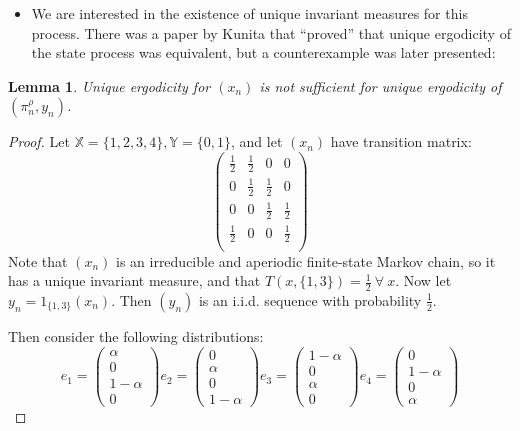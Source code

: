 \documentclass{article}
\newtheorem{lemma}[theorem]{Lemma}
\begin{document}
\begin{itemize}
    \item We are interested in the existence of unique invariant measures for this process. There was a paper by Kunita that ``proved'' that unique ergodicity of the state process was equivalent, but a counterexample was later presented:
\end{itemize}

\begin{lemma}
    Unique ergodicity for \((x_n)\) is not sufficient for unique ergodicity of \((\pi^\rho_n,y_n)\).
\end{lemma}

\begin{proof}
    Let \(\mathbb{X} = \{1,2,3,4\}, \mathbb{Y} = \{0,1\}\), and let \((x_n)\) have transition matrix:
    \[
        \begin{pmatrix}
            \frac{1}{2} & \frac{1}{2} & 0           & 0           \\
            0           & \frac{1}{2} & \frac{1}{2} & 0           \\
            0           & 0           & \frac{1}{2} & \frac{1}{2} \\
            \frac{1}{2} & 0           & 0           & \frac{1}{2} \\
        \end{pmatrix}\]
    Note that \((x_n)\) is an irreducible and aperiodic finite-state Markov chain, so it has a unique invariant measure, and that \(T(x,\{1,3\}) = \frac{1}{2} \: \forall \: x\). Now let \(y_n = 1_{\{1,3\}}(x_n)\). Then \((y_n)\) is an i.i.d. sequence with probability \(\frac{1}{2}\).

    Then consider the following distributions:
    \[e_1 = \begin{pmatrix}
            \alpha \\ 0 \\ 1 - \alpha \\ 0
        \end{pmatrix}
        e_2 = \begin{pmatrix}
            0 \\ \alpha \\ 0 \\ 1 - \alpha
        \end{pmatrix}
        e_3 = \begin{pmatrix}
            1 - \alpha \\ 0 \\ \alpha \\ 0
        \end{pmatrix}
        e_4 = \begin{pmatrix}
            0 \\ 1 - \alpha \\ 0 \\ \alpha
        \end{pmatrix}\]


\end{proof}
\end{document}
